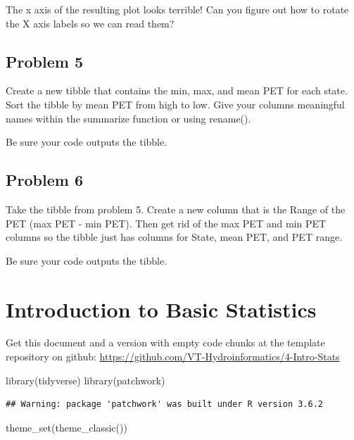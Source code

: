 \documentclass[
]{book}
\newenvironment{Shaded}{\begin{snugshade}}{\end{snugshade}}
\newcommand{\FunctionTok}[1]{\textcolor[rgb]{0.00,0.00,0.00}{#1}}
\newcommand{\NormalTok}[1]{#1}
\begin{document}
The x axis of the resulting plot looks terrible! Can you figure out how to rotate the X axis labels so we can read them?

\hypertarget{problem-5}{%
\section{Problem 5}\label{problem-5}}

Create a new tibble that contains the min, max, and mean PET for each state. Sort the tibble by mean PET from high to low. Give your columns meaningful names within the summarize function or using rename().

Be sure your code outputs the tibble.

\hypertarget{problem-6}{%
\section{Problem 6}\label{problem-6}}

Take the tibble from problem 5. Create a new column that is the Range of the PET (max PET - min PET). Then get rid of the max PET and min PET columns so the tibble just has columns for State, mean PET, and PET range.

Be sure your code outputs the tibble.

\hypertarget{stats}{%
\chapter{Introduction to Basic Statistics}\label{stats}}

Get this document and a version with empty code chunks at the template repository on github: \url{https://github.com/VT-Hydroinformatics/4-Intro-Stats}

\begin{Shaded}
\begin{Highlighting}[]
\FunctionTok{library}\NormalTok{(tidyverse)}
\FunctionTok{library}\NormalTok{(patchwork)}
\end{Highlighting}
\end{Shaded}

\begin{verbatim}
## Warning: package 'patchwork' was built under R version 3.6.2
\end{verbatim}

\begin{Shaded}
\begin{Highlighting}[]
\FunctionTok{theme\_set}\NormalTok{(}\FunctionTok{theme\_classic}\NormalTok{())}
\end{Highlighting}
\end{Shaded}
\end{document}
